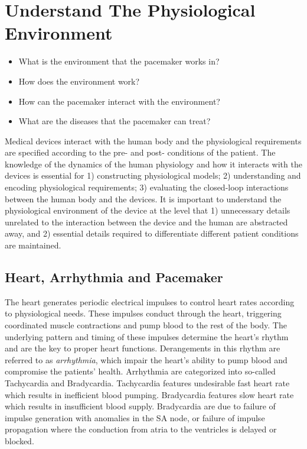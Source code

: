 \documentclass[openany]{now} %
\begin{document}
\chapter{Understand The Physiological Environment}
\begin{itemize}
	\item What is the environment that the pacemaker works in?
    \item How does the environment work?
    \item How can the pacemaker interact with the environment?
    \item What are the diseases that the pacemaker can treat?
\end{itemize}

Medical devices interact with the human body and the physiological requirements are specified according to the pre- and post- conditions of the patient. The knowledge of the dynamics of the human physiology and how it interacts with the devices is essential for 1) constructing physiological models; 2) understanding and encoding physiological requirements; 3) evaluating the closed-loop interactions between the human body and the devices. It is important to understand the physiological environment of the device at the level that 1) unnecessary details unrelated to the interaction between the device and the human are abstracted away, and 2) essential details required to differentiate different patient conditions are maintained.

\section{Heart, Arrhythmia and Pacemaker}
The heart generates periodic electrical impulses to control heart rates according to physiological needs. These impulses conduct through the heart, triggering coordinated muscle contractions and pump blood to the rest of the body. The underlying pattern and timing of these impulses determine the heart's rhythm and are the key to proper heart functions. Derangements in this rhythm are referred to as \emph{arrhythmia}, which impair the heart's ability to pump blood and compromise the patients' health. Arrhythmia are categorized into so-called \textsf{Tachycardia} and \textsf{Bradycardia}. Tachycardia features undesirable fast heart rate which results in inefficient blood pumping. Bradycardia features slow heart rate which results in insufficient blood supply. Bradycardia are due to failure of impulse generation with anomalies in the SA node, or failure of impulse propagation where the conduction from atria to the ventricles is delayed or blocked. 
\end{document}
